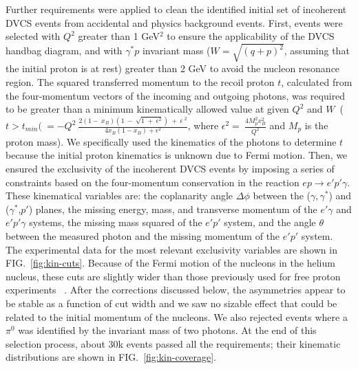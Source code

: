 \documentclass[twocolumn,nofootinbib,showpacs,prl,superscriptaddress,secnumarabic,amssymb,nobibnotes,aps,floatfix]{revtex4}
\begin{document}
Further requirements were applied to clean the identified initial set of 
incoherent DVCS events from accidental and physics background events. First, 
events were selected with $Q^{2}$ greater than 1 GeV$^2$ to ensure the 
applicability of the DVCS handbag diagram, and with $\gamma^{*}p$ invariant 
mass ($W=\sqrt{(q+p)^2}$, assuming that the initial proton is at rest) greater 
than 2 GeV to avoid the nucleon resonance region. The squared transferred 
momentum to the recoil proton $t$, calculated from the four-momentum vectors of 
the incoming and outgoing photons, was required to be greater than a minimum 
kinematically allowed value at given $Q^2$ and 
$W$~($t>t_{min}(~=-Q^{2}~\frac{2(1-~x_{B})(1~-~\sqrt{1~+~\epsilon^{2}})~+~\epsilon~^{2}}{4x_{B}(1-x_{B})+\epsilon^{2}}$, 
where $\epsilon^{2}=~\frac{4M^{2}_{p}x^{2}_{B}}{Q^{2}}$ and $M_{p}$ is the 
proton mass). We specifically used the kinematics of the photons to determine 
$t$ because the initial proton kinematics is unknown due to Fermi motion. Then, 
we ensured the exclusivity of the incoherent DVCS events by imposing a series 
of constraints based on the four-momentum conservation in the reaction 
$ep\rightarrow e'p'\gamma$. These kinematical variables are: the coplanarity 
angle $\Delta\phi$ between the ($\gamma,\gamma^*$) and ($\gamma^*$,$p'$) 
planes, the missing energy, mass, and transverse momentum of the $e'\gamma$ and 
$e'p'\gamma$ systems, the missing mass squared of the $e'p'$ system, and the 
angle $\theta$ between the measured photon and the missing momentum of the 
$e'p'$ system. The experimental data for the most relevant exclusivity 
variables are shown in FIG.~\ref{fig:kin-cuts}. Because of the Fermi motion of 
the nucleons in the helium nucleus, these cuts
are slightly wider than those previously used for free proton experiments~%
\cite{Girod:2007aa}. After the corrections discussed below, the asymmetries 
appear to be stable as a function of cut width and we saw no sizable effect 
that could be related to the initial momentum of the nucleons. We also rejected 
events where a $\pi^0$ was identified by the invariant mass of two photons. At 
the end of this selection process, about 30k events passed all the 
requirements; their kinematic distributions are shown in 
FIG.~\ref{fig:kin-coverage}.  
\end{document}

